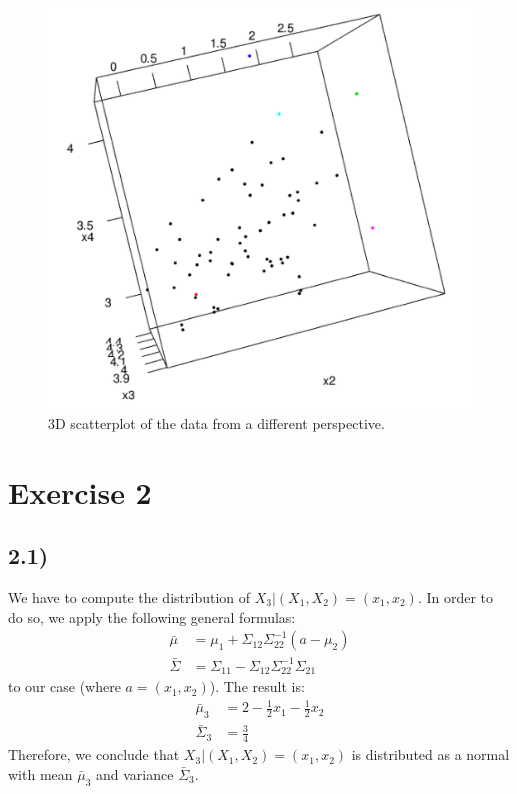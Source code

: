 \documentclass[a4paper,11pt,oneside]{report}
\begin{document}
	\begin{figure}[H]
	\centering
	\includegraphics[scale = 0.55]{3dplot2.png}
	\caption{3D scatterplot of the data from a different perspective.}
	\end{figure}

\newpage
\section*{Exercise 2}
\subsection*{2.1)}
	We have to compute the distribution of $X_3|(X_1, X_2) = (x_1, x_2)$.
	In order to do so, we apply the following general formulas:
	\begin{align}
		\bar \mu &= \mu_1 + \Sigma_{12} \Sigma_{22}^{-1}(a - \mu_2) \label{eq:cond_mean} \\
		\bar \Sigma &= \Sigma_{11} - \Sigma_{12} \Sigma_{22}^{-1} \Sigma_{21} \label{eq:cond_Sigma}
	\end{align}
	to our case (where $a = (x_1, x_2)$). The result is:
	\begin{align}
		\bar \mu_3 &= 2 - \frac{1}{2}x_1 - \frac{1}{2}x_2\\
		\bar \Sigma_3 &= \frac{3}{4}
	\end{align}
	Therefore, we conclude that $X_3|(X_1, X_2) = (x_1, x_2)$ is distributed as a normal with mean $\bar \mu_3$ and variance $\bar \Sigma_3$.
	
\end{document}
